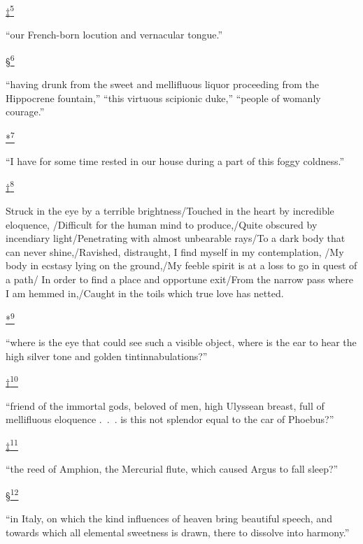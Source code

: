 \protect\hypertarget{23_NOTES.xhtmlux5cux23id_2796}{\protect\hyperlink{22_Chapter_Fourteen__THE_COMING_OF.xhtmlux5cux23id_2795}{‡\textsuperscript{5}}}
``our French-born locution and vernacular tongue.''

\protect\hypertarget{23_NOTES.xhtmlux5cux23id_2794}{\protect\hyperlink{22_Chapter_Fourteen__THE_COMING_OF.xhtmlux5cux23id_2793}{§\textsuperscript{6}}}
``having drunk from the sweet and mellifluous liquor proceeding from the
Hippocrene fountain,'' ``this virtuous scipionic duke,'' ``people of
womanly courage.''

\protect\hypertarget{23_NOTES.xhtmlux5cux23id_2792}{\protect\hyperlink{22_Chapter_Fourteen__THE_COMING_OF.xhtmlux5cux23id_2791}{*\textsuperscript{7}}}
``I have for some time rested in our house during a part of this foggy
coldness.''

\protect\hypertarget{23_NOTES.xhtmlux5cux23id_2790}{\protect\hyperlink{22_Chapter_Fourteen__THE_COMING_OF.xhtmlux5cux23id_2789}{†\textsuperscript{8}}}
Struck in the eye by a terrible brightness/Touched in the heart by
incredible eloquence, /Difficult for the human mind to produce,/Quite
obscured by incendiary light/Penetrating with almost unbearable rays/To
a dark body that can never shine,/Ravished, distraught, I find myself in
my contemplation, /My body in ecstasy lying on the ground,/My feeble
spirit is at a loss to go in quest of a path/ In order to find a place
and opportune exit/From the narrow pass where I am hemmed in,/Caught in
the toils which true love has netted.

\protect\hypertarget{23_NOTES.xhtmlux5cux23id_2378}{\protect\hyperlink{22_Chapter_Fourteen__THE_COMING_OF.xhtmlux5cux23id_2377}{*\textsuperscript{9}}}
``where is the eye that could see such a visible object, where is the
ear to hear the high silver tone and golden tintinnabulations?''

\protect\hypertarget{23_NOTES.xhtmlux5cux23id_2379}{\protect\hyperlink{22_Chapter_Fourteen__THE_COMING_OF.xhtmlux5cux23id_2380}{†\textsuperscript{10}}}
``friend of the immortal gods, beloved of men, high Ulyssean breast,
full of mellifluous eloquence .~.~. is this not splendor equal to the
car of Phoebus?''

\protect\hypertarget{23_NOTES.xhtmlux5cux23id_2382}{\protect\hyperlink{22_Chapter_Fourteen__THE_COMING_OF.xhtmlux5cux23id_2381}{‡\textsuperscript{11}}}
``the reed of Amphion, the Mercurial flute, which caused Argus to fall
sleep?''

\protect\hypertarget{23_NOTES.xhtmlux5cux23id_2384}{\protect\hyperlink{22_Chapter_Fourteen__THE_COMING_OF.xhtmlux5cux23id_2383}{§\textsuperscript{12}}}
``in Italy, on which the kind influences of heaven bring beautiful
speech, and towards which all elemental sweetness is drawn, there to
dissolve into harmony.''

